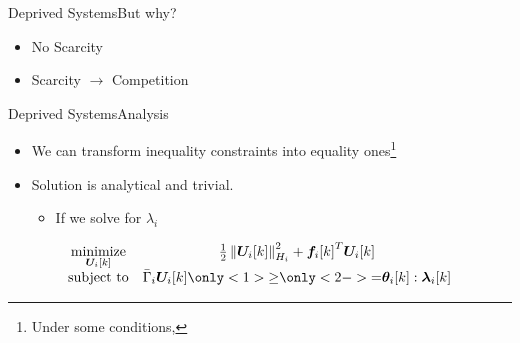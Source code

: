 \documentclass[aspectratio=169]{beamer}
\begin{document}
\begin{frame}{Deprived Systems}{But why?}
  \centering
  \begin{itemize}
    \item<2-> No Scarcity   
    \item<6-> Scarcity $\to$ Competition  
  \end{itemize}
\end{frame}

\begin{frame}{Deprived Systems}{Analysis}
   \begin{itemize}
    \item<2-> We can transform inequality constraints into equality ones\footnote{Under some conditions,  }
    \item<3-> Solution is analytical and trivial.
   \begin{itemize}
    \item<4-> If we solve for $\lambda_{i}$
   \end{itemize}
   \end{itemize}
   \centering

\begin{equation*}
   \begin{matrix}
      {\minimize\limits_{\vec{U}_{i}[k]}}&{\frac{1}{2}\norm{\vec{U}_{i}[k]}^{2}_{H_{i}} + {\vec{f}_{i}[k]}^{T}\vec{U}_{i}[k]}\\
      \mathrm{subject~ to} & \bar{\Gamma}_{i}\vec{U}_{i}[k] \only<1>{\geq}\only<2->{=} \thetaik:\lambdaik
    \end{matrix}
  \end{equation*}

\end{frame}
\end{document}
